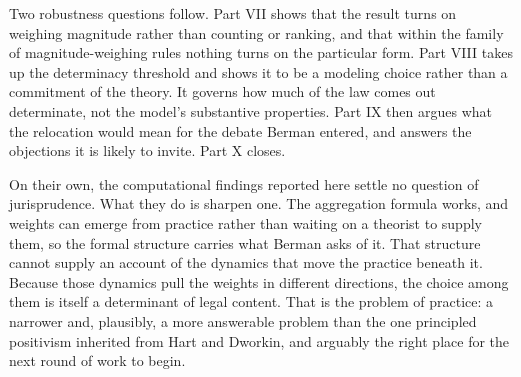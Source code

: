 Two robustness questions follow. Part VII shows that the result turns on
weighing magnitude rather than counting or ranking, and that within the
family of magnitude-weighing rules nothing turns on the particular form.
Part VIII takes up the determinacy threshold and shows it to be a modeling
choice rather than a commitment of the theory. It governs how much of the
law comes out determinate, not the model's substantive properties. Part IX then argues what the relocation would mean for the debate Berman
entered, and answers the objections it is likely to invite. Part X closes.

On their own, the computational findings reported here settle no question of
jurisprudence. What they do is sharpen one. The aggregation formula works,
and weights can emerge from practice rather than waiting on a theorist to
supply them, so the formal structure carries what Berman asks of it. That
structure cannot supply an account of the dynamics that move the
practice beneath it. Because those dynamics pull the weights in different
directions, the choice among them is itself a determinant of legal content.
That is the problem of practice: a narrower and, plausibly, a more
answerable problem than the one principled positivism inherited from
Hart and Dworkin, and arguably the right place for the next round of work to
begin.
